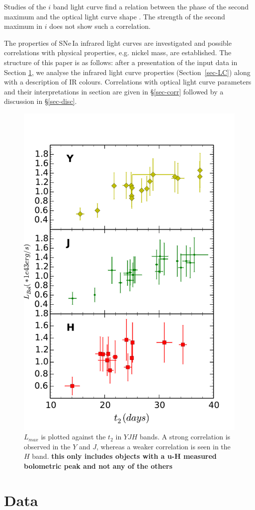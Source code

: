 \documentclass{aa}
\begin{document}
Studies of the $i$ band light curve find a relation between the phase
of the second maximum and the optical light curve shape 
\citep[e.g. $\Delta m_{15}(B)$, ][]{Folatelli2010, Hamuy1996}. The strength
of the second maximum in $i$ does not show such a correlation.

The properties of SNe\,Ia infrared light curves are investigated and
possible correlations with physical properties, e.g. nickel mass, are
established. The structure of this paper is as follows: after a
presentation of the input data in Section \ref{sec:data}, we analyse the
infrared light curve properties (Section~\ref{sec-LC}) along with a
description of IR colours. Correlations with optical light curve
parameters and their interpretations in section are given in
\S\ref{sec-corr} followed by a discussion in \S\ref{sec-disc}.

\fi


\begin{figure}
\centering
\includegraphics[width=.50\textwidth, height=0.6\textheight]{../plot_rel/t2lbol.pdf}
\caption{$L_{max}$ is plotted against the $t_2$ in $YJH$ bands. A strong correlation is observed in the $Y$ and $J$, whereas a weaker correlation is seen in the $H$ band. {\bf this only includes objects with a u-H measured bolometric peak and not any of the others}}
\label{fig:nit2}
\end{figure}



\section{Data} 
\label{sec:data}
%
\end{document}
